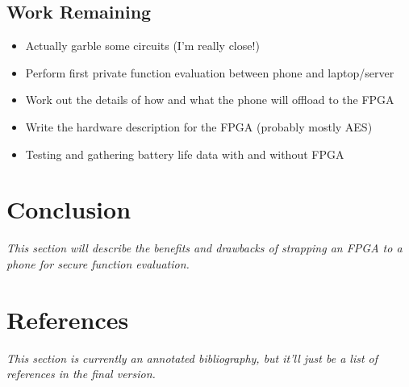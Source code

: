 \documentclass[letterpaper]{article}
\newcommand{\comment}[1]{{\color{red}\textit{#1}}}
\begin{document}
{\subsection{Work Remaining}

\begin{itemize}
	\item Actually garble some circuits (I'm really close!)
	\item Perform first private function evaluation between phone and laptop/server
	\item Work out the details of how and what the phone will offload to the FPGA
	\item Write the hardware description for the FPGA (probably mostly AES)
	\item Testing and gathering battery life data with and without FPGA
\end{itemize}

}
\section{Conclusion}
\comment{This section will describe the benefits and drawbacks of strapping an FPGA to a phone for secure function evaluation.}

\section{References}
\comment{This section is currently an annotated bibliography, but it'll just be a list of references in the final version.}

\printbibliography[heading=none]
\end{document}
